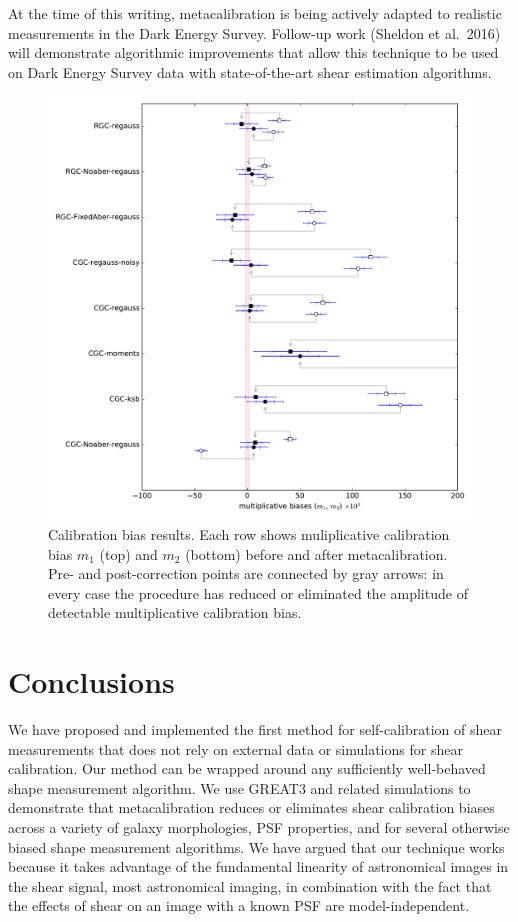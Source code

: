 \documentclass[iop]{emulateapj}
\begin{document}
At the time of this writing, metacalibration is being actively adapted
to realistic measurements in the Dark Energy Survey. Follow-up work
(Sheldon et al.\ 2016) will demonstrate algorithmic improvements that
allow this technique to be used on Dark Energy Survey data with
state-of-the-art shear estimation algorithms.

\begin{figure}[t]
\begin{center}
\includegraphics[width=0.8\linewidth]{./Plots/m_results_linear.pdf}
\end{center}
\caption{Calibration bias results. Each row shows muliplicative
  calibration bias $m_1$ (top) and $m_2$ (bottom) before and after
  metacalibration. Pre- and post-correction points are connected by
  gray arrows: in every case the procedure has reduced or eliminated
  the amplitude of detectable multiplicative calibration bias.}
\label{fig:m_results}
\end{figure}

\section{Conclusions}
We have proposed and implemented the first method for self-calibration
of shear measurements that does not rely on external data or
simulations for shear calibration. Our method can be wrapped around
any sufficiently well-behaved shape measurement algorithm.  We use
GREAT3 and related simulations to demonstrate that metacalibration
reduces or eliminates shear calibration biases across a variety of
galaxy morphologies, PSF properties, and for several otherwise biased
shape measurement algorithms. We have argued that our technique works
because it takes advantage of the fundamental linearity of
astronomical images in the shear signal, most astronomical
imaging, in combination with the fact that the effects of
shear on an image with a known PSF are model-independent.
\end{document}
